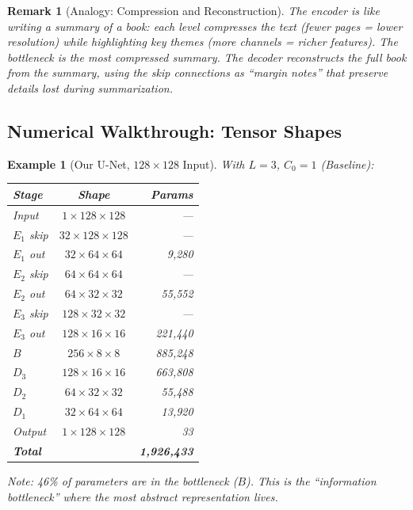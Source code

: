 \documentclass[10pt,twocolumn]{article}
\newtheorem{remark}[definition]{Remark}
\newtheorem{example}[definition]{Example}
\begin{document}
\begin{remark}[Analogy: Compression and Reconstruction]
The encoder is like writing a summary of a book: each level compresses the text (fewer pages = lower resolution) while highlighting key themes (more channels = richer features). The bottleneck is the most compressed summary. The decoder reconstructs the full book from the summary, using the skip connections as ``margin notes'' that preserve details lost during summarization.
\end{remark}

\subsection{Numerical Walkthrough: Tensor Shapes}

\begin{example}[Our U-Net, $128\times128$ Input]\label{ex:shapes}
With $L=3$, $C_0=1$ (Baseline):

\begin{center}
\begin{tabular}{lcr}
\toprule
\textbf{Stage} & \textbf{Shape} & \textbf{Params} \\
\midrule
Input & $1 \times 128 \times 128$ & --- \\
$E_1$ skip & $32 \times 128 \times 128$ & --- \\
$E_1$ out & $32 \times 64 \times 64$ & 9,280 \\
$E_2$ skip & $64 \times 64 \times 64$ & --- \\
$E_2$ out & $64 \times 32 \times 32$ & 55,552 \\
$E_3$ skip & $128 \times 32 \times 32$ & --- \\
$E_3$ out & $128 \times 16 \times 16$ & 221,440 \\
$B$ & $256 \times 8 \times 8$ & 885,248 \\
$D_3$ & $128 \times 16 \times 16$ & 663,808 \\
$D_2$ & $64 \times 32 \times 32$ & 55,488 \\
$D_1$ & $32 \times 64 \times 64$ & 13,920 \\
Output & $1 \times 128 \times 128$ & 33 \\
\midrule
\textbf{Total} & & \textbf{1,926,433} \\
\bottomrule
\end{tabular}
\end{center}

Note: 46\% of parameters are in the bottleneck ($B$). This is the ``information bottleneck'' where the most abstract representation lives.
\end{example}
\end{document}
